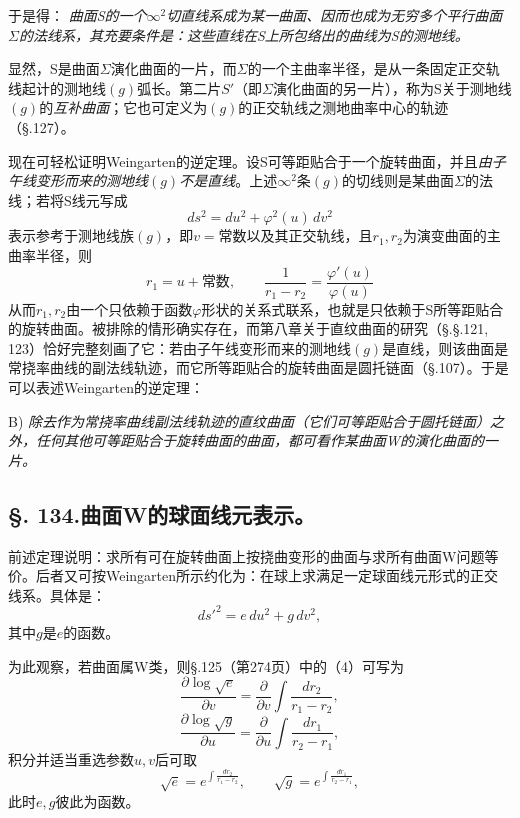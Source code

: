 于是得：
\emph{曲面S的一个\(\infty^2\)切直线系成为某一曲面、因而也成为无穷多个平行曲面\(\Sigma\)的法线系，其充要条件是：这些直线在S上所包络出的曲线为S的测地线。}

显然，S是曲面\(\Sigma\)演化曲面的一片，而\(\Sigma\)的一个主曲率半径，是从一条固定正交轨线起计的测地线\((g)\)弧长。第二片\(S'\)（即\(\Sigma\)演化曲面的另一片），称为S关于测地线\((g)\)的\emph{互补曲面}；它也可定义为\((g)\)的正交轨线之测地曲率中心的轨迹（\S.127）。

现在可轻松证明Weingarten的逆定理。设S可等距贴合于一个旋转曲面，并且\emph{由子午线变形而来的测地线\((g)\)不是直线}。上述\(\infty^2\)条\((g)\)的切线则是某曲面\(\Sigma\)的法线；若将S线元写成
\[
 ds^2=du^2+\varphi^2(u)\,dv^2
\]
表示参考于测地线族\((g)\)，即\(v=\)常数以及其正交轨线，且\(r_1,r_2\)为演变曲面的主曲率半径，则
\[
 r_1=u+\text{常数},
 \qquad
 \frac1{r_1-r_2}=\frac{\varphi'(u)}{\varphi(u)}
\]
从而\(r_1,r_2\)由一个只依赖于函数\(\varphi\)形状的关系式联系，也就是只依赖于S所等距贴合的旋转曲面。被排除的情形确实存在，而第八章关于直纹曲面的研究（\S.\S.121, 123）恰好完整刻画了它：若由子午线变形而来的测地线\((g)\)是直线，则该曲面是常挠率曲线的副法线轨迹，而它所等距贴合的旋转曲面是圆托链面（\S.107）。于是可以表述Weingarten的逆定理：

B) 
\emph{除去作为常挠率曲线副法线轨迹的直纹曲面（它们可等距贴合于圆托链面）之外，任何其他可等距贴合于旋转曲面的曲面，都可看作某曲面W的演化曲面的一片。}

\subsection*{\S. 134.\quad 曲面W的球面线元表示。}

前述定理说明：求所有可在旋转曲面上按挠曲变形的曲面与求所有曲面W问题等价。后者又可按Weingarten所示约化为：在球上求满足一定球面线元形式的正交线系。具体是：
\[
 ds'^2=e\,du^2+g\,dv^2,
\]
其中\(g\)是\(e\)的函数。

为此观察，若曲面属W类，则\S.125（第274页）中的（4）可写为
\[
 \frac{\partial\log\sqrt e}{\partial v}=\frac\partial{\partial v}\int\frac{dr_2}{r_1-r_2},
\]
\[
 \frac{\partial\log\sqrt g}{\partial u}=\frac\partial{\partial u}\int\frac{dr_1}{r_2-r_1},
\]
积分并适当重选参数\(u,v\)后可取
\begin{equation}\tag{20}
 \sqrt e=e^{\int\frac{dr_2}{r_1-r_2}},
 \qquad
 \sqrt g=e^{\int\frac{dr_1}{r_2-r_1}},
\end{equation}
此时\(e,g\)彼此为函数。

